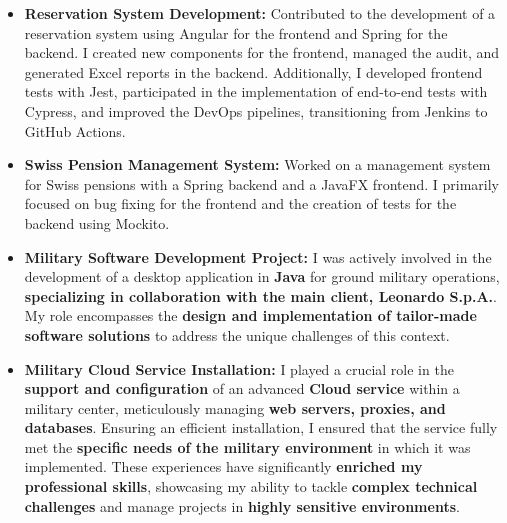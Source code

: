 \documentclass[10pt,a4paper]{altacv}
\begin{document}
\begin{itemize}
  \item \textbf{Reservation System Development:} Contributed to the development of a reservation system using Angular for the frontend and Spring for the backend. I created new components for the frontend, managed the audit, and generated Excel reports in the backend. Additionally, I developed frontend tests with Jest, participated in the implementation of end-to-end tests with Cypress, and improved the DevOps pipelines, transitioning from Jenkins to GitHub Actions.

  \item \textbf{Swiss Pension Management System:} Worked on a management system for Swiss pensions with a Spring backend and a JavaFX frontend. I primarily focused on bug fixing for the frontend and the creation of tests for the backend using Mockito.
\end{itemize}

\vspace{1em}

\begin{itemize}
  \item \textbf{Military Software Development Project:} I was actively involved in the development of a desktop application in \textbf{Java} for ground military operations, \textbf{specializing in collaboration with the main client, Leonardo S.p.A.}. My role encompasses the \textbf{design and implementation of tailor-made software solutions} to address the unique challenges of this context.
  \item \textbf{Military Cloud Service Installation:} I played a crucial role in the \textbf{support and configuration} of an advanced \textbf{Cloud service} within a military center, meticulously managing \textbf{web servers, proxies, and databases}. Ensuring an efficient installation, I ensured that the service fully met the \textbf{specific needs of the military environment} in which it was implemented.
  These experiences have significantly \textbf{enriched my professional skills}, showcasing my ability to tackle \textbf{complex technical challenges} and manage projects in \textbf{highly sensitive environments}.
\end{itemize}

\vspace{1em}
\end{document}
